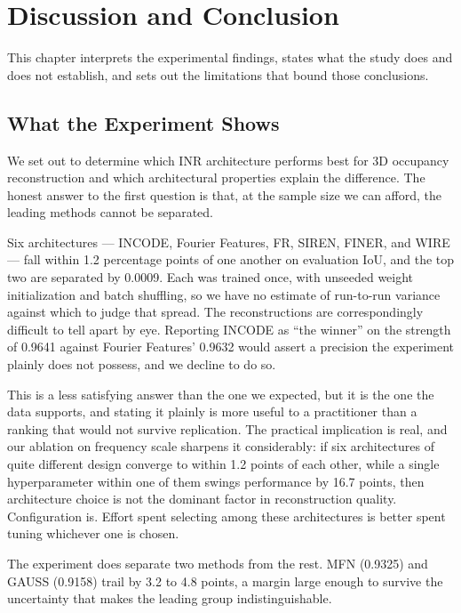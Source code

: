 \chapter{Discussion and Conclusion}
\label{ch:discussion}

This chapter interprets the experimental findings, states what the study does and does not establish, and sets out the limitations that bound those conclusions.

\section{What the Experiment Shows}

We set out to determine which INR architecture performs best for 3D occupancy reconstruction and which architectural properties explain the difference. The honest answer to the first question is that, at the sample size we can afford, the leading methods cannot be separated.

Six architectures --- INCODE, Fourier Features, FR, SIREN, FINER, and WIRE --- fall within 1.2 percentage points of one another on evaluation IoU, and the top two are separated by 0.0009. Each was trained once, with unseeded weight initialization and batch shuffling, so we have no estimate of run-to-run variance against which to judge that spread. The reconstructions are correspondingly difficult to tell apart by eye. Reporting INCODE as ``the winner'' on the strength of 0.9641 against Fourier Features' 0.9632 would assert a precision the experiment plainly does not possess, and we decline to do so.

This is a less satisfying answer than the one we expected, but it is the one the data supports, and stating it plainly is more useful to a practitioner than a ranking that would not survive replication. The practical implication is real, and our ablation on frequency scale sharpens it considerably: if six architectures of quite different design converge to within 1.2 points of each other, while a single hyperparameter within one of them swings performance by 16.7 points, then architecture choice is not the dominant factor in reconstruction quality. Configuration is. Effort spent selecting among these architectures is better spent tuning whichever one is chosen.

The experiment does separate two methods from the rest. MFN (0.9325) and GAUSS (0.9158) trail by 3.2 to 4.8 points, a margin large enough to survive the uncertainty that makes the leading group indistinguishable.

